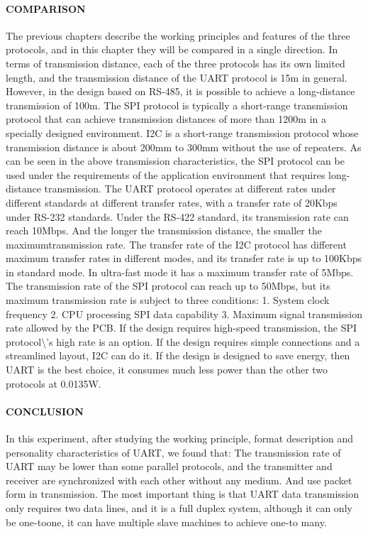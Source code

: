 \documentclass[12pt,a4paper]{article}
\numberwithin{equation}{section}
\begin{document}
\paragraph{COMPARISON}

The previous chapters describe the working principles and features of
the three protocols, and in this chapter they will be compared in a
single direction. In terms of transmission distance, each of the three
protocols has its own limited length, and the transmission distance of
the UART protocol is 15m in general. However, in the design based on
RS-485, it is possible to achieve a long-distance transmission of 100m.
The SPI protocol is typically a short-range transmission protocol that
can achieve transmission distances of more than 1200m in a specially
designed environment. I2C is a short-range transmission protocol whose
transmission distance is about 200mm to 300mm without the use of
repeaters. As can be seen in the above transmission characteristics, the
SPI protocol can be used under the requirements of the application
environment that requires long-distance transmission. The UART protocol
operates at different rates under different standards at different
transfer rates, with a transfer rate of 20Kbps under RS-232 standards.
Under the RS-422 standard, its transmission rate can reach 10Mbps. And
the longer the transmission distance, the smaller the
maximumtransmission rate. The transfer rate of the I2C protocol has
different maximum transfer rates in different modes, and its transfer
rate is up to 100Kbps in standard mode. In ultra-fast mode it has a
maximum transfer rate of 5Mbps. The transmission rate of the SPI
protocol can reach up to 50Mbps, but its maximum transmission rate is
subject to three conditions: 1. System clock frequency 2. CPU processing
SPI data capability 3. Maximum signal transmission rate allowed by the
PCB. If the design requires high-speed transmission, the SPI protocol\textbackslash{}'s
high rate is an option. If the design requires simple connections and a
streamlined layout, I2C can do it. If the design is designed to save
energy, then UART is the best choice, it consumes much less power than
the other two protocols at 0.0135W.

\paragraph{CONCLUSION}

In this experiment, after studying the working principle, format
description and personality characteristics of UART, we found that: The
transmission rate of UART may be lower than some parallel protocols, and
the transmitter and receiver are synchronized with each other without
any medium. And use packet form in transmission. The most important
thing is that UART data transmission only requires two data lines, and
it is a full duplex system, although it can only be one-toone, it can
have multiple slave machines to achieve one-to many.
\end{document}
